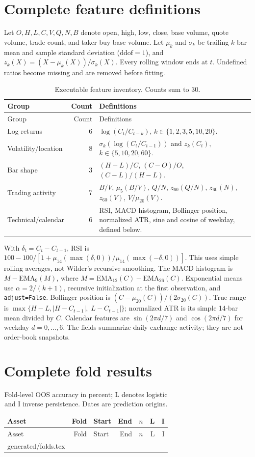 \documentclass[preprint,12pt,authoryear]{elsarticle}
\makeatletter
\def\inputrows#1{\@@input #1 }
\makeatother
\begin{document}
\appendix
\section{Complete feature definitions}\label{app:features}
Let $O,H,L,C,V,Q,N,B$ denote open, high, low, close, base volume, quote volume, trade count, and taker-buy base volume. Let $\mu_k$ and $\sigma_k$ be trailing $k$-bar mean and sample standard deviation ($\mathrm{ddof}=1$), and $z_k(X)=(X-\mu_k(X))/\sigma_k(X)$. Every rolling window ends at $t$. Undefined ratios become missing and are removed before fitting.
\begin{longtable}{p{}rp{}}
\caption{Executable feature inventory. Counts sum to 30.}\\\toprule
Group & Count & Definitions\\\midrule\endfirsthead
\toprule Group & Count & Definitions\\\midrule\endhead
Log returns & 6 & $\log(C_t/C_{t-k})$, $k\in\{1,2,3,5,10,20\}$.\\
Volatility/location & 8 & $\sigma_k(\log(C_t/C_{t-1}))$ and $z_k(C_t)$, $k\in\{5,10,20,60\}$.\\
Bar shape & 3 & $(H-L)/C$, $(C-O)/O$, $(C-L)/(H-L)$.\\
Trading activity & 7 & $B/V$, $\mu_5(B/V)$, $Q/N$, $z_{60}(Q/N)$, $z_{60}(N)$, $z_{60}(V)$, $V/\mu_{20}(V)$.\\
Technical/calendar & 6 & RSI, MACD histogram, Bollinger position, normalized ATR, sine and cosine of weekday, defined below.\\\bottomrule
\end{longtable}
With $\delta_t=C_t-C_{t-1}$, RSI is $100-100/[1+\mu_{14}(\max(\delta,0))/\mu_{14}(\max(-\delta,0))]$. This uses simple rolling averages, not Wilder's recursive smoothing. The MACD histogram is $M-\mathrm{EMA}_9(M)$, where $M=\mathrm{EMA}_{12}(C)-\mathrm{EMA}_{26}(C)$. Exponential means use $\alpha=2/(k+1)$, recursive initialization at the first observation, and \texttt{adjust=False}. Bollinger position is $(C-\mu_{20}(C))/(2\sigma_{20}(C))$. True range is $\max\{H-L,|H-C_{t-1}|,|L-C_{t-1}|\}$; normalized ATR is its simple 14-bar mean divided by $C$. Calendar features are $\sin(2\pi d/7)$ and $\cos(2\pi d/7)$ for weekday $d=0,\ldots,6$. The fields summarize daily exchange activity; they are not order-book snapshots.

\section{Complete fold results}\label{app:folds}
\begin{longtable}{lrlrrrr}
\caption{Fold-level OOS accuracy in percent; L denotes logistic and I inverse persistence. Dates are prediction origins.}\\\toprule
Asset & Fold & Start & End & $n$ & L & I\\\midrule\endfirsthead
\toprule Asset & Fold & Start & End & $n$ & L & I\\\midrule\endhead
\inputrows{generated/folds.tex}
\bottomrule\end{longtable}
\end{document}
